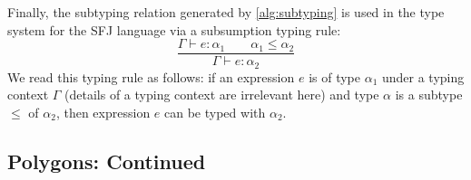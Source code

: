 \documentclass[runningheads]{llncs}
\begin{document}


Finally, the subtyping relation generated by \autoref{alg:subtyping} is used in the type system for the SFJ language via a subsumption typing rule:
 $$
 \frac{\Gamma\vdash e:\alpha_1 \qquad \alpha_1 \leq \alpha_2}{\Gamma \vdash e:\alpha_2}
 $$
We read this typing rule as follows:
if an expression $e$ is of type $\alpha_1$ under a typing context $\Gamma$ (details of a typing context are irrelevant here) and type $\alpha$ is a subtype $\leq$ of $\alpha_2$, then expression $e$ can be typed with $\alpha_2$.


\subsection{Polygons: Continued}
\end{document}
